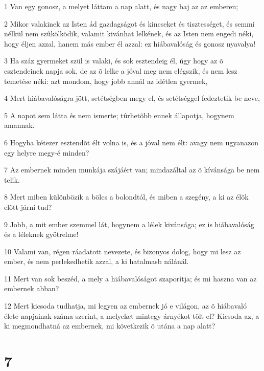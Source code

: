 \par 1 Van egy gonosz, a melyet láttam a nap alatt, és nagy baj az az emberen;
\par 2 Mikor valakinek az Isten ád gazdagságot és kincseket és tisztességet, és semmi nélkül nem szûkölködik, valamit kivánhat lelkének, és az Isten nem engedi néki, hogy éljen azzal, hanem más ember él azzal: ez hiábavalóság és gonosz nyavalya!
\par 3 Ha száz gyermeket szül is valaki, és sok esztendeig él, úgy hogy az õ esztendeinek napja sok, de az õ lelke a jóval meg nem elégszik, és nem lesz temetése néki: azt mondom, hogy jobb annál az idétlen gyermek,
\par 4 Mert hiábavalóságra jött, setétségben megy el, és setétséggel fedeztetik be neve,
\par 5 A napot sem látta és nem ismerte; tûrhetõbb ennek állapotja, hogynem amannak.
\par 6 Hogyha kétezer esztendõt élt volna is, és a jóval nem élt: avagy nem ugyanazon egy helyre megy-é minden?
\par 7 Az embernek minden munkája szájáért van; mindazáltal az õ kívánsága be nem telik.
\par 8 Mert miben különbözik a bölcs a bolondtól, és miben a szegény, a ki az élõk elõtt járni tud?
\par 9 Jobb, a mit ember szemmel lát, hogynem a lélek kivánsága; ez is hiábavalóság és a léleknek gyötrelme!
\par 10 Valami van, régen ráadatott nevezete, és bizonyos dolog, hogy mi lesz az ember, és nem perlekedhetik azzal, a ki hatalmasb nálánál.
\par 11 Mert van sok beszéd, a mely a hiábavalóságot szaporítja; és mi haszna van az embernek abban?
\par 12 Mert kicsoda tudhatja, mi legyen az embernek jó e világon, az õ hiábavaló élete napjainak száma szerint, a melyeket mintegy árnyékot tölt el? Kicsoda az, a ki megmondhatná az embernek, mi következik õ utána a nap alatt?

\chapter{7}

